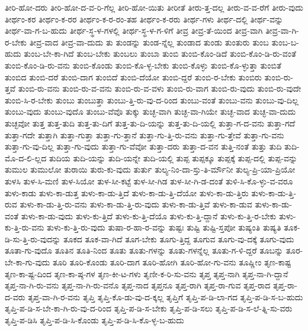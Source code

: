 {ತೀರಿ-ಹೋ-ದರು
ತೀರಿ-ಹೋ-ದ-ವ-ರಿ-ಗೆಲ್ಲ
ತೀರಿ-ಹೋ-ಯಿತು
ತೀರೀತೆ
ತೀರು-ತ್ತ-ದಲ್ಲ
ತೀರು-ವ-ವ-ರೆಗೆ
ತೀರು-ವುದು
ತೀರ್ಥಂ-ಕರ
ತೀರ್ಥಂ-ಕ-ರರ
ತೀರ್ಥಂ-ಕ-ರ-ರಂ-ತಹ
ತೀರ್ಥಂ-ಕ-ರರು
ತೀರ್ಥ-ಗಳು
ತೀರ್ಥ-ದಲ್ಲಿ
ತೀರ್ಥ-ವನ್ನು
ತೀರ್ಥ-ವಾ-ಗ-ಬ-ಹುದು
ತೀರ್ಥ-ಸ್ಥ-ಳ-ಗಳಲ್ಲಿ
ತೀರ್ಥ-ಸ್ಥ-ಳ-ಗ-ಳಿಗೆ
ತೀವ್ರ
ತೀವ್ರ-ತೆ-ಯಿಂದ
ತೀವ್ರ-ವಾಗಿ
ತೀವ್ರ-ವಾ-ಗಿ-ರ-ಬೇಕು
ತೀವ್ರ-ವಾದ
ತೀವ್ರ-ವಾ-ದುದು
ತು
ತುಂಡನ್ನು
ತುಂಡ-ನ್ನೆಲ್ಲ
ತುಂಡಾದ
ತುಂಡು
ತುಂತುರು
ತುಂಬ
ತುಂಬ-ಬ-ಹುದು
ತುಂಬ-ಬೇ-ಕಾ-ಗಿದೆ
ತುಂಬ-ಬೇಕು
ತುಂಬಲು
ತುಂಬಾ
ತುಂಬಿ
ತುಂಬಿ-ಕೊಂ-ಡಿದೆ
ತುಂಬಿ-ಕೊಂ-ಡಿ-ರು-ವಂತೆ
ತುಂಬಿ-ಕೊಂ-ಡಿ-ರು-ವನು
ತುಂಬಿ-ಕೊಂಡು
ತುಂಬಿ-ಕೊ-ಳ್ಳ-ಬೇಕು
ತುಂಬಿ-ಕೊಳ್ಳು
ತುಂಬಿ-ಕೊ-ಳ್ಳುತ್ತಾ
ತುಂಬಿತೆ
ತುಂಬಿದ
ತುಂಬಿ-ದರೆ
ತುಂಬಿ-ದಾಗ
ತುಂಬಿದೆ
ತುಂಬಿ-ದೆಯೋ
ತುಂಬಿ-ದ್ದರೆ
ತುಂಬಿ-ರ-ಬೇಕು
ತುಂಬಿರು
ತುಂಬಿ-ರು-ತ್ತವೆ
ತುಂಬಿ-ರು-ವನು
ತುಂಬಿ-ರು-ವ-ವನು
ತುಂಬಿ-ರು-ವ-ವಳು
ತುಂಬಿ-ರು-ವಾಗ
ತುಂಬಿ-ರು-ವುದು
ತುಂಬಿ-ರು-ವುದೇ
ತುಂಬಿ-ಸಿ-ರ-ಬೇಕು
ತುಂಬು
ತುಂಬುತ್ತಾ
ತುಂಬು-ತ್ತಿ-ರು-ವು-ದ-ರಿಂದ
ತುಂಬು-ವಂತೆ
ತುಂಬು-ವನು
ತುಂಬು-ವು-ದಿಲ್ಲ
ತುಂಬು-ವುದು
ತುಂಬು-ವುದೊ
ತುಂಬು-ವೆವೊ
ತುಕ್ಕು
ತುಚ್ಛ-ವಾಗಿ
ತುಚ್ಛ-ವಾ-ಗಿಯೇ
ತುಚ್ಛ-ವಾದ
ತುಚ್ಛ-ವಾ-ದುದು
ತುಚ್ಛವೋ
ತುತ್ತ
ತುತ್ತ-ತುದಿ
ತುತ್ತ-ತು-ದಿಗೆ
ತುತ್ತ-ತು-ದಿ-ಯನ್ನು
ತುತ್ತ-ತು-ದಿ-ಯಲ್ಲಿ
ತುತ್ತಾ-ಗ-ದ-ವನು
ತುತ್ತಾ-ಗದೆ
ತುತ್ತಾ-ಗದೇ
ತುತ್ತಾಗಿ
ತುತ್ತಾ-ಗುತ್ತಾ
ತುತ್ತಾ-ಗು-ತ್ತಾನೆ
ತುತ್ತಾ-ಗು-ತ್ತಿ-ರು-ವನು
ತುತ್ತಾ-ಗು-ತ್ತೇವೆ
ತುತ್ತಾ-ಗು-ವನು
ತುತ್ತಾ-ಗು-ವು-ದಿಲ್ಲ
ತುತ್ತಾ-ಗು-ವುದು
ತುತ್ತಾ-ಗು-ವೆವೋ
ತುತ್ತಾ-ದರು
ತುತ್ತಾ-ದ-ವನ
ತುತ್ತಿ-ನಂತೆ
ತುತ್ತು
ತುದಿ
ತುದಿ-ಮೊ-ದ-ಲಿ-ಲ್ಲದ
ತುದಿಯ
ತುದಿ-ಯನ್ನು
ತುದಿ-ಯನ್ನೇ
ತುದಿ-ಯಲ್ಲಿ
ತುಪ್ಪ
ತುಪ್ಪಕ್ಕೂ
ತುಪ್ಪಕ್ಕೆ
ತುಪ್ಪ-ದಲ್ಲಿ
ತುಪ್ಪ-ವನ್ನು
ತುಮುಲ
ತುಮುಲೋ
ತುರಾಯಿ
ತುರು-ಕು-ವುದು
ತುರ್ತು
ತುಲ್ಯ-ನಿಂ-ದಾ-ಸ್ತು-ತಿ-ರ್ಮೌನೀ
ತುಲ್ಯ-ಪ್ರಿ-ಯಾ-ಪ್ರಿಯೋ
ತುಳಸಿ
ತುಳ-ಸಿ-ಮಣಿ
ತುಳ-ಸಿಯೋ
ತುಳ-ಸೀ-ಕಟ್ಟೆ
ತುಳ-ಸೀ-ಗಿಡ
ತುಳ-ಸೀ-ಗಿ-ಡ-ದಂತೆ
ತುಳಿ-ಸಿ-ಕೊ-ಳ್ಳು-ವ-ವರೂ
ತುಳು-ಕಾಡು
ತುಳು-ಕಾ-ಡುತ್ತ
ತುಳು-ಕಾ-ಡು-ತ್ತಿದೆ
ತುಳು-ಕಾ-ಡು-ತ್ತಿ-ದೆಯೋ
ತುಳು-ಕಾ-ಡು-ತ್ತಿರು
ತುಳು-ಕಾ-ಡು-ತ್ತಿ-ರುವ
ತುಳು-ಕಾ-ಡು-ತ್ತಿ-ರು-ವನು
ತುಳು-ಕಾ-ಡು-ತ್ತಿ-ರು-ವುದು
ತುಳು-ಕಾ-ಡು-ತ್ತಿವೆ
ತುಳು-ಕಾ-ಡುವ
ತುಳು-ಕಾ-ಡು-ವಂತೆ
ತುಳು-ಕಾ-ಡು-ವುದು
ತುಳು-ಕು-ತ್ತಿದೆ
ತುಳು-ಕು-ತ್ತಿ-ದೆಯೊ
ತುಳು-ಕು-ತ್ತಿ-ದ್ದಾನೆ
ತುಳು-ಕು-ತ್ತಿ-ರ-ಬೇಕು
ತುಳು-ಕು-ತ್ತಿ-ರು-ವನು
ತುಳು-ಕು-ತ್ತಿ-ರು-ವುದು
ತುಷಾ-ರ-ಹಾ-ರ-ವನ್ನು
ತುಷ್ಟಃ
ತುಷ್ಟಿ
ತುಷ್ಟಿ-ಸ್ತಪೋ
ತುಷ್ಯಂತಿ
ತುಷ್ಯತಿ
ತೂಕ-ಡಿ-ಸು-ತ್ತಿ-ರು-ವುದನ್ನು
ತೂಕದ
ತೂಕ-ವಾ-ಗಿದೆ
ತೂಗ-ಬೇಕು
ತೂಗು-ತ್ತಿದ್ದ
ತೂಗುವ
ತೂಗು-ವು-ದಕ್ಕೆ
ತೂಗು-ವುದು
ತೂತಾ-ಗು-ವುದೊ
ತೂತಿನ
ತೂತಿ-ನಿಂದ
ತೂತು
ತೂತು-ಗಳನ್ನು
ತೂತು-ಗಳನ್ನೆಲ್ಲ
ತೂತು-ಗ-ಳಿ-ದ್ದರೆ
ತೂಬನ್ನು
ತೂರ-ಬೇ-ಕಾ-ಗು-ವುದು
ತೂರಿ
ತೂರಿ-ಕೊಂಡು
ತೂರಿ-ದಾಗ
ತೂರಿ-ಹೋಗಿ
ತೂರಿ-ಹೋ-ಗು-ವನು
ತೂಷ್ಣೀಂ
ತೃಣ-ಕಾಷ್ಟ
ತೃಣ-ಕಾ-ಷ್ಟ-ದಿಂದ
ತೃಣ-ಕಾ-ಷ್ಠ-ಗಳ
ತೃಣ-ಕೀ-ಟ-ಗಳು
ತೃಣೀ-ಕ-ರಿ-ಸು-ವನು
ತೃಪ್ತ
ತೃಪ್ತ-ನಾಗಿ
ತೃಪ್ತ-ನಾ-ಗಿ-ದ್ದಾನೆ
ತೃಪ್ತ-ನಾ-ಗಿ-ರು-ವನು
ತೃಪ್ತ-ನಾ-ಗಿ-ರು-ವನೊ
ತೃಪ್ತ-ನಾದ
ತೃಪ್ತನೂ
ತೃಪ್ತ-ರಾಗಿ
ತೃಪ್ತ-ರಾ-ಗುವ
ತೃಪ್ತ-ರಾದ
ತೃಪ್ತ-ರಾ-ದ-ವರು
ತೃಪ್ತ-ವಾ-ಗಿ-ರ-ವನು
ತೃಪ್ತಿ
ತೃಪ್ತಿ-ಕೊ-ಡು-ವು-ದ-ಕ್ಕಲ್ಲ
ತೃಪ್ತಿಗೆ
ತೃಪ್ತಿ-ಪ-ಡಿ-ಲಾ-ಗದ
ತೃಪ್ತಿ-ಪ-ಡಿ-ಸ-ಬ-ಹುದು
ತೃಪ್ತಿ-ಪ-ಡಿ-ಸ-ಬೇ-ಕಾ-ಗಿ-ರು-ವು-ದ-ರಿಂದ
ತೃಪ್ತಿ-ಪ-ಡಿ-ಸ-ಬೇಕು
ತೃಪ್ತಿ-ಪ-ಡಿ-ಸಲು
ತೃಪ್ತಿ-ಪ-ಡಿ-ಸ-ಲೆ-ತ್ನಿ-ಸು-ವರು
ತೃಪ್ತಿ-ಪ-ಡಿಸಿ
ತೃಪ್ತಿ-ಪ-ಡಿ-ಸಿ-ಕೊಂಡು
ತೃಪ್ತಿ-ಪ-ಡಿ-ಸಿ-ಕೊ-ಳ್ಳ-ಬ-ಹುದು
}
